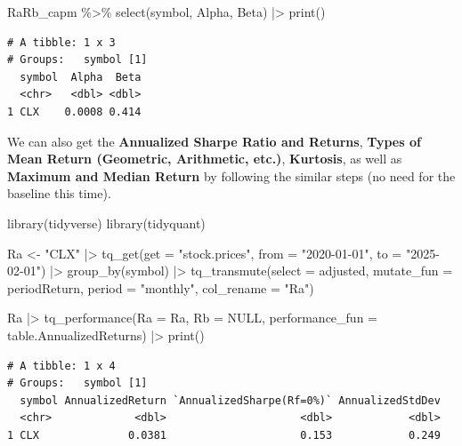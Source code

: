 \documentclass[
  letterpaper,
  DIV=11,
  numbers=noendperiod]{scrartcl}
\newenvironment{Shaded}{\begin{snugshade}}{\end{snugshade}}
\newcommand{\AttributeTok}[1]{\textcolor[rgb]{0.40,0.45,0.13}{#1}}
\newcommand{\ConstantTok}[1]{\textcolor[rgb]{0.56,0.35,0.01}{#1}}
\newcommand{\FunctionTok}[1]{\textcolor[rgb]{0.28,0.35,0.67}{#1}}
\newcommand{\NormalTok}[1]{\textcolor[rgb]{0.00,0.23,0.31}{#1}}
\newcommand{\OtherTok}[1]{\textcolor[rgb]{0.00,0.23,0.31}{#1}}
\newcommand{\SpecialCharTok}[1]{\textcolor[rgb]{0.37,0.37,0.37}{#1}}
\newcommand{\StringTok}[1]{\textcolor[rgb]{0.13,0.47,0.30}{#1}}
\begin{document}
\begin{Shaded}
\begin{Highlighting}[]
\NormalTok{RaRb\_capm }\SpecialCharTok{\%\textgreater{}\%} \FunctionTok{select}\NormalTok{(symbol, Alpha, Beta) }\SpecialCharTok{|\textgreater{}} \FunctionTok{print}\NormalTok{()}
\end{Highlighting}
\end{Shaded}

\begin{verbatim}
# A tibble: 1 x 3
# Groups:   symbol [1]
  symbol  Alpha  Beta
  <chr>   <dbl> <dbl>
1 CLX    0.0008 0.414
\end{verbatim}

We can also get the \textbf{Annualized Sharpe Ratio and Returns},
\textbf{Types of Mean Return (Geometric, Arithmetic, etc.)},
\textbf{Kurtosis}, as well as \textbf{Maximum and Median Return} by
following the similar steps (no need for the baseline this time).

\begin{Shaded}
\begin{Highlighting}[]
\FunctionTok{library}\NormalTok{(tidyverse)}
\FunctionTok{library}\NormalTok{(tidyquant)}

\NormalTok{Ra }\OtherTok{\textless{}{-}} \StringTok{"CLX"} \SpecialCharTok{|\textgreater{}}
    \FunctionTok{tq\_get}\NormalTok{(}\AttributeTok{get  =} \StringTok{"stock.prices"}\NormalTok{,}
           \AttributeTok{from =} \StringTok{"2020{-}01{-}01"}\NormalTok{,}
           \AttributeTok{to   =} \StringTok{"2025{-}02{-}01"}\NormalTok{) }\SpecialCharTok{|\textgreater{}}
    \FunctionTok{group\_by}\NormalTok{(symbol) }\SpecialCharTok{|\textgreater{}}
    \FunctionTok{tq\_transmute}\NormalTok{(}\AttributeTok{select     =}\NormalTok{ adjusted, }
                 \AttributeTok{mutate\_fun =}\NormalTok{ periodReturn, }
                 \AttributeTok{period     =} \StringTok{"monthly"}\NormalTok{, }
                 \AttributeTok{col\_rename =} \StringTok{"Ra"}\NormalTok{)}

\NormalTok{Ra }\SpecialCharTok{|\textgreater{}}
  \FunctionTok{tq\_performance}\NormalTok{(}\AttributeTok{Ra =}\NormalTok{ Ra, }\AttributeTok{Rb =} \ConstantTok{NULL}\NormalTok{, }\AttributeTok{performance\_fun =}\NormalTok{ table.AnnualizedReturns) }\SpecialCharTok{|\textgreater{}}
  \FunctionTok{print}\NormalTok{()}
\end{Highlighting}
\end{Shaded}

\begin{verbatim}
# A tibble: 1 x 4
# Groups:   symbol [1]
  symbol AnnualizedReturn `AnnualizedSharpe(Rf=0%)` AnnualizedStdDev
  <chr>             <dbl>                     <dbl>            <dbl>
1 CLX              0.0381                     0.153            0.249
\end{verbatim}
\end{document}
